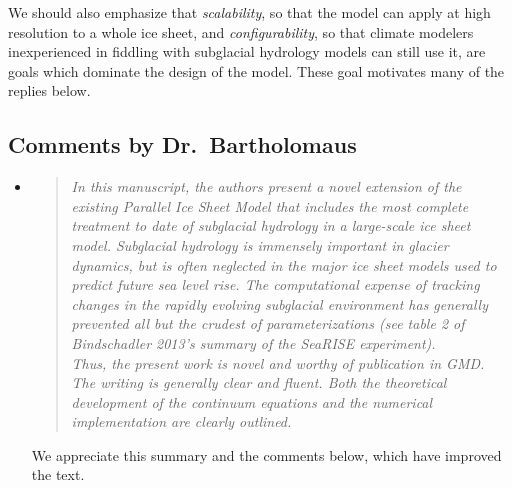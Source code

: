 \documentclass[11pt,reqno]{amsart}
\newcommand{\reply}[2]{
\medskip\medskip
\item  \begin{quote}
\emph{#1}
\end{quote}

\medskip
\noindent #2}
\begin{document}
We should also emphasize that \emph{scalability}, so that the model can apply at high resolution to a whole ice sheet, and \emph{configurability}, so that climate modelers inexperienced in fiddling with subglacial hydrology models can still use it, are goals which dominate the design of the model.  These goal motivates many of the replies below.


\subsection*{Comments by Dr.~Bartholomaus}\begin{itemize}

\reply{In this manuscript, the authors present a novel extension of the existing Parallel Ice Sheet Model that includes the most complete treatment to date of subglacial hydrology in a large-scale ice sheet model.  Subglacial hydrology is immensely important in glacier dynamics, but is often neglected in the major ice sheet models used to predict future sea level rise.  The computational expense of tracking changes in the rapidly evolving subglacial environment has generally prevented all but the crudest of parameterizations (see table 2 of Bindschadler 2013's summary of the SeaRISE experiment).\\
Thus, the present work is novel and worthy of publication in GMD.  The writing is generally clear and fluent.  Both the theoretical development of the continuum equations and the numerical implementation are clearly outlined.}
{We appreciate this summary and the comments below, which have improved the text.}


\end{itemize}
\end{document}
